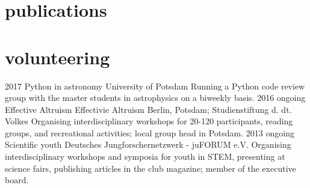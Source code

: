 \documentclass[]{k-cv} %
\begin{document}

\section{publications}

\section{volunteering}
\begin{entrylist}
\entry
{2017 }
{Python in astronomy}
{University of Potsdam}
{Running a Python code review group with the master students in astrophysics on a biweekly basis.}
\entry
{2016 \to ongoing}
{Effective Altruism}
{Effectivie Altruism Berlin, Potsdam; Studienstiftung d. dt. Volkes}
{Organising interdisciplinary workshops for 20-120 participants, reading groups, and recreational activities; local group head in Potsdam.}
\entry
{2013 \to ongoing}
{Scientific youth}
{Deutsches Jungforschernetzwerk - juFORUM e.V.}
{Organising interdisciplinary workshops and symposia for youth in STEM, presenting at science fairs, publishing articles in the club magazine; member of the executive board.}
\end{entrylist}
\end{document}
